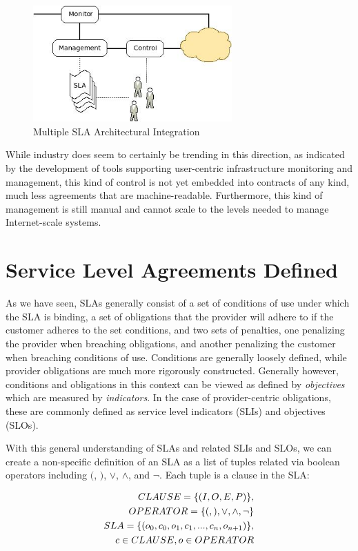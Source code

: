 \documentclass[a4paper,twoside]{article}
\begin{document}
\begin{figure}[!t]
\centering
\includegraphics[width=3in]{cloud-future}
\caption{Multiple SLA Architectural Integration}
\label{fig:future-cloud-model}
\end{figure}

While industry does seem to certainly be trending in this direction, as indicated by the development of tools supporting user-centric infrastructure monitoring and management, this kind of control is not yet embedded into contracts of any kind, much less agreements that are machine-readable. Furthermore, this kind of management is still manual and cannot scale to the levels needed to manage Internet-scale systems.

\section{Service Level Agreements Defined}\label{sec:SLA-defined}
As we have seen, SLAs generally consist of a set of conditions of use under which the SLA is binding, a set of obligations that the provider will adhere to if the customer adheres to the set conditions, and two sets of penalties, one penalizing the provider when breaching obligations, and another penalizing the customer when breaching conditions of use.  Conditions are generally loosely defined, while provider obligations are much more rigorously constructed.  Generally however, conditions and obligations in this context can be viewed as defined by {\it objectives} which are measured by {\it indicators}.  In the case of provider-centric obligations, these are commonly defined as service level indicators (SLIs) and objectives (SLOs).

With this general understanding of SLAs and related SLIs and SLOs, we can create a non-specific definition of an SLA as a list of tuples related via boolean operators including $($, $)$, $\lor$, $\land$, and $\lnot$.  Each tuple is a clause in the SLA:

\begin{eqnarray}
CLAUSE = \lbrace (I,O,E,P) \rbrace, \\
OPERATOR = \lbrace ( , ) , \lor, \land, \lnot \rbrace \\
SLA = \lbrace ( o_{0}, c_{0}, o_{1}, c_{1}, ..., c_{n}, o_{n + 1} ) \rbrace , \\ c \in CLAUSE, o \in OPERATOR \notag
\end{eqnarray}
\end{document}

